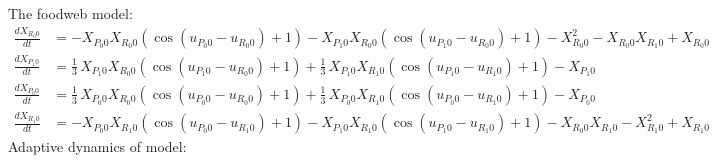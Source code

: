 \documentclass{article}
\begin{document}
The foodweb model:
\[\begin{align*}
\frac{dX_{ R_{0} 0 }}{dt} &= -X_{ P_{0} 0 } X_{ R_{0} 0 } {\left(\cos\left(u_{ P_{0} 0 } - u_{ R_{0} 0 }\right) + 1\right)} - X_{ P_{1} 0 } X_{ R_{0} 0 } {\left(\cos\left(u_{ P_{1} 0 } - u_{ R_{0} 0 }\right) + 1\right)} - X_{ R_{0} 0 }^{2} - X_{ R_{0} 0 } X_{ R_{1} 0 } + X_{ R_{0} 0 }\\
\frac{dX_{ P_{1} 0 }}{dt} &= \frac{1}{3} \, X_{ P_{1} 0 } X_{ R_{0} 0 } {\left(\cos\left(u_{ P_{1} 0 } - u_{ R_{0} 0 }\right) + 1\right)} + \frac{1}{3} \, X_{ P_{1} 0 } X_{ R_{1} 0 } {\left(\cos\left(u_{ P_{1} 0 } - u_{ R_{1} 0 }\right) + 1\right)} - X_{ P_{1} 0 }\\
\frac{dX_{ P_{0} 0 }}{dt} &= \frac{1}{3} \, X_{ P_{0} 0 } X_{ R_{0} 0 } {\left(\cos\left(u_{ P_{0} 0 } - u_{ R_{0} 0 }\right) + 1\right)} + \frac{1}{3} \, X_{ P_{0} 0 } X_{ R_{1} 0 } {\left(\cos\left(u_{ P_{0} 0 } - u_{ R_{1} 0 }\right) + 1\right)} - X_{ P_{0} 0 }\\
\frac{dX_{ R_{1} 0 }}{dt} &= -X_{ P_{0} 0 } X_{ R_{1} 0 } {\left(\cos\left(u_{ P_{0} 0 } - u_{ R_{1} 0 }\right) + 1\right)} - X_{ P_{1} 0 } X_{ R_{1} 0 } {\left(\cos\left(u_{ P_{1} 0 } - u_{ R_{1} 0 }\right) + 1\right)} - X_{ R_{0} 0 } X_{ R_{1} 0 } - X_{ R_{1} 0 }^{2} + X_{ R_{1} 0 }
\end{align*}\]
Adaptive dynamics of model:
\end{document}
